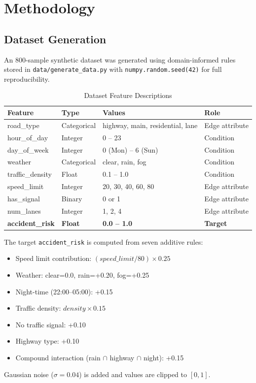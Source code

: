 \documentclass[12pt,a4paper]{report}
\begin{document}
\chapter{Methodology}

\section{Dataset Generation}
An 800-sample synthetic dataset was generated using domain-informed rules stored in \texttt{data/generate\_data.py} with \texttt{numpy.random.seed(42)} for full reproducibility.

\begin{table}[h!]
\centering
\caption{Dataset Feature Descriptions}
\begin{tabular}{llll}
\toprule
\textbf{Feature} & \textbf{Type} & \textbf{Values} & \textbf{Role} \\
\midrule
road\_type & Categorical & highway, main, residential, lane & Edge attribute \\
hour\_of\_day & Integer & 0 -- 23 & Condition \\
day\_of\_week & Integer & 0 (Mon) -- 6 (Sun) & Condition \\
weather & Categorical & clear, rain, fog & Condition \\
traffic\_density & Float & 0.1 -- 1.0 & Condition \\
speed\_limit & Integer & 20, 30, 40, 60, 80 & Edge attribute \\
has\_signal & Binary & 0 or 1 & Edge attribute \\
num\_lanes & Integer & 1, 2, 4 & Edge attribute \\
\textbf{accident\_risk} & \textbf{Float} & \textbf{0.0 -- 1.0} & \textbf{Target} \\
\bottomrule
\end{tabular}
\end{table}

The target \texttt{accident\_risk} is computed from seven additive rules:
\begin{itemize}
  \item Speed limit contribution: $(speed\_limit / 80) \times 0.25$
  \item Weather: clear=0.0, rain=+0.20, fog=+0.25
  \item Night-time (22:00--05:00): +0.15
  \item Traffic density: $density \times 0.15$
  \item No traffic signal: +0.10
  \item Highway type: +0.10
  \item Compound interaction (rain $\cap$ highway $\cap$ night): +0.15
\end{itemize}
Gaussian noise ($\sigma = 0.04$) is added and values are clipped to $[0, 1]$.
\end{document}
